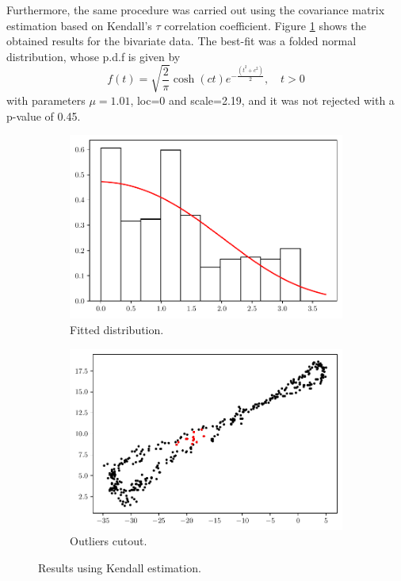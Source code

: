 \documentclass[11pt]{article}
\theoremstyle{definition}
\theoremstyle{remark}
\theoremstyle{remark}
\begin{document}
Furthermore, the same procedure was carried out using the covariance
matrix estimation based on Kendall's $\tau$ correlation
coefficient. Figure \ref{fig:kendall_cut_nnoise} shows the obtained
results for the bivariate data.  The best-fit was a folded normal
distribution, whose p.d.f is given by
\[
  f(t)=\sqrt{\dfrac{2}{\pi}}\cosh{(ct)}e^{-\frac{(t^2+c^2)}{2}},\quad
  t>0
\]
with parameters $\mu=1.01$, loc=0 and scale=2.19, and it was not
rejected with a p-value of 0.45.
\begin{figure}[H]
  \centering
  \begin{subfigure}[t]{0.475\textwidth}
    \centering
    \includegraphics[scale=0.45]{../figs/kendall_hist_no-noise.pdf}
    \caption{Fitted distribution.}
  \end{subfigure}
  \begin{subfigure}[t]{0.475\textwidth}
    \centering
    \includegraphics[scale=0.45]{../figs/kendall_scatter_no-noise.pdf}
    \caption{Outliers cutout.}
    \end{subfigure}
  \caption{Results using Kendall estimation.}
  \label{fig:kendall_cut_nnoise}
\end{figure}
\end{document}
